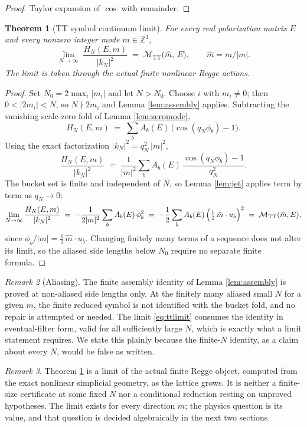 \documentclass[11pt]{article}
\newtheorem{theorem}{Theorem}[section]
\theoremstyle{definition}
\theoremstyle{remark}
\newtheorem{remark}[theorem]{Remark}
\newcommand{\Z}{\mathbb{Z}}
\newcommand{\TT}{\mathrm{TT}}
\begin{document}
\begin{proof}
Taylor expansion of $\cos$ with remainder.
\end{proof}

\begin{theorem}[TT symbol continuum limit]
\label{thm:limit}
For every real polarization matrix $E$ and every nonzero integer mode $m\in\Z^3$,
\begin{equation}
\lim_{N\to\infty}\;\frac{H_N(E,m)}{|k_N|^{2}} \;=\; \mathcal{M}_{\TT}\bigl(\hat m,\, E\bigr),
\qquad \hat m = m/|m|.
\label{eq:ttlimit}
\end{equation}
The limit is taken through the actual finite nonlinear Regge actions.
\end{theorem}

\begin{proof}
Set $N_0 = 2\max_i |m_i|$ and let $N > N_0$. Choose $i$ with $m_i\neq 0$; then $0 < |2m_i| < N$, so $N\nmid 2m_i$ and Lemma \ref{lem:assembly} applies. Subtracting the vanishing scale-zero fold of Lemma \ref{lem:zeromode},
\[
H_N(E,m) \;=\; \sum_{b} A_b(E)\,\bigl(\cos(q_N\phi_b) - 1\bigr).
\]
Using the exact factorization $|k_N|^2 = q_N^2\,|m|^2$,
\[
\frac{H_N(E,m)}{|k_N|^2} \;=\; \frac{1}{|m|^2}\sum_b A_b(E)\,\frac{\cos(q_N\phi_b)-1}{q_N^2}.
\]
The bucket set is finite and independent of $N$, so Lemma \ref{lem:jet} applies term by term as $q_N\to 0$:
\[
\lim_{N\to\infty}\frac{H_N(E,m)}{|k_N|^2}
\;=\; -\frac{1}{2|m|^2}\sum_b A_b(E)\,\phi_b^2
\;=\; -\frac12\sum_b A_b(E)\,\Bigl(\tfrac12\,\hat m\cdot u_b\Bigr)^2
\;=\; \mathcal{M}_{\TT}(\hat m, E),
\]
since $\phi_b/|m| = \tfrac12\,\hat m\cdot u_b$. Changing finitely many terms of a sequence does not alter its limit, so the aliased side lengths below $N_0$ require no separate finite formula.
\end{proof}

\begin{remark}[Aliasing]
\label{rem:alias}
The finite assembly identity of Lemma \ref{lem:assembly} is proved at non-aliased side lengths only. At the finitely many aliased small $N$ for a given $m$, the finite reduced symbol is not identified with the bucket fold, and no repair is attempted or needed. The limit \eqref{eq:ttlimit} consumes the identity in eventual-filter form, valid for all sufficiently large $N$, which is exactly what a limit statement requires. We state this plainly because the finite-$N$ identity, as a claim about every $N$, would be false as written.
\end{remark}

\begin{remark}
Theorem \ref{thm:limit} is a limit of the actual finite Regge object, computed from the exact nonlinear simplicial geometry, as the lattice grows. It is neither a finite-size certificate at some fixed $N$ nor a conditional reduction resting on unproved hypotheses. The limit exists for every direction $\hat m$; the physics question is its value, and that question is decided algebraically in the next two sections.
\end{remark}
\end{document}
